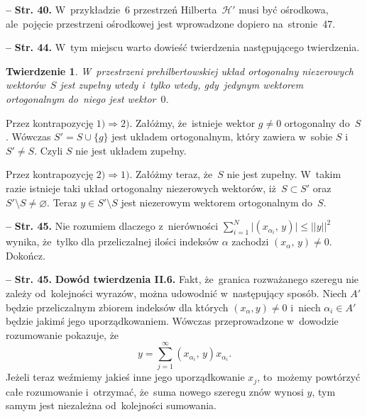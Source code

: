 \documentclass[a4paper,11pt]{article}
\newtheorem{twr}{Twierdzenie}
\let\emptyset\varnothing
\newcommand{\mc}{\mathcal}
\newcommand{\Ra}{\Rightarrow}
\newcommand{\wtw}{wtedy i~tylko wtedy}
\newcommand{\al}{\alpha}
\newcommand{\Hc}{\mc{H}}
\newcommand{\set}[1]{\{ #1 \}}
\newcommand{\es}{\emptyset}
\newcommand{\sset}{\subset}
\newcommand{\setm}{\setminus}
\newcommand{\Sum}{\sum\limits}
\providecommand{\absj}[1]{\lvert #1 \rvert}
\newcommand{\norm}[1]{\left|\left| #1 \right|\right|}
\newcommand{\tb}{\textbf}
\newcommand{\noi}{\noindent}
\newcommand{\start}{\noi \tb{--} {}}
\newcommand{\Str}[1]{\tb{Str. #1.}}
\newcommand{\Dok}{{\color{red} Dokończ.}}
\newcommand{\SP}[2]{( #1, \, #2 )} %
\begin{document}
\start \Str{40} W~przykładzie~6 przestrzeń Hilberta~$\Hc'$ musi być
ośrodkowa, ale~pojęcie przestrzeni ośrodkowej jest wprowadzone dopiero
na~stronie~47. %


\start \Str{44} W~tym miejscu warto dowieść twierdzenia następującego
twierdzenia.
\begin{twr}
  W~przestrzeni prehilbertowskiej układ ortogonalny niezerowych
  wektorów~$S$ jest zupełny \wtw, gdy~jedynym wektorem ortogonalnym
  do~niego jest wektor~$0$.
\end{twr}

Przez kontrapozycję $1) \Ra 2)$. Załóżmy, że~istnieje wektor
$g \neq 0$ ortogonalny do~$S$. Wówczas $S' = S \cup \set{ g }$ jest
układem ortogonalnym, który zawiera w~sobie $S$ i~$S' \neq S$. Czyli
$S$ nie jest układem zupełny.

Przez kontrapozycję $2) \Ra 1)$. Załóżmy teraz, że~$S$ nie jest
zupełny. W~takim razie istnieje taki układ ortogonalny niezerowych
wektorów, iż~$S \sset S'$ oraz $S' \setm S \neq \es$. Teraz
$y \in S' \setm S$ jest niezerowym wektorem ortogonalnym do~$S$.


\start \Str{45} Nie rozumiem dlaczego z~nierówności
$\sum_{ i = 1 }^{ N } \absj{ \SP{ x_{ \al_{ i } } }{ y } } \leq \norm{
  y }^{ 2 }$ wynika, że~tylko dla przeliczalnej ilości indeksów $\al$
zachodzi $\SP{ x_{ \al } }{ y } \neq 0$. \Dok


\start \Str{45} \tb{Dowód twierdzenia II.6.} Fakt, że~granica
rozważanego szeregu nie zależy od~kolejności wyrazów, można udowodnić
w~następujący sposób. Niech $A'$ będzie przeliczalnym zbiorem indeksów
dla których $( x_{ \al }, y ) \neq 0$ i~niech $\al_{ i } \in A'$
będzie jakimś jego uporządkowaniem. Wówczas przeprowadzone w~dowodzie
rozumowanie pokazuje, że
\begin{equation}
  y = \Sum_{ j = 1 }^{ \infty } \SP{ x_{ \al_{ i } } }{ y } x_{ \al_{ i } }.
\end{equation}
Jeżeli teraz weźmiemy jakieś inne jego uporządkowanie $x_{ j }$,
to~możemy powtórzyć całe rozumowanie i~otrzymać, że~suma nowego
szeregu znów wynosi $y$, tym samym jest niezależna od~kolejności
sumowania.
\end{document}
